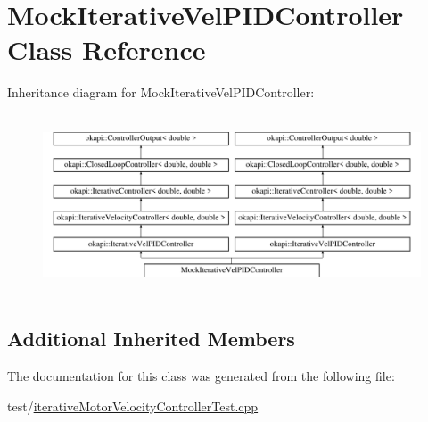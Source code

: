 \hypertarget{classMockIterativeVelPIDController}{}\section{Mock\+Iterative\+Vel\+P\+I\+D\+Controller Class Reference}
\label{classMockIterativeVelPIDController}
Inheritance diagram for Mock\+Iterative\+Vel\+P\+I\+D\+Controller\+:\begin{figure}[H]
\begin{center}
\leavevmode
\includegraphics[height=5.384615cm]{classMockIterativeVelPIDController}
\end{center}
\end{figure}
\subsection*{Additional Inherited Members}


The documentation for this class was generated from the following file\+:\begin{DoxyCompactItemize}
\item 
test/\mbox{\hyperlink{iterativeMotorVelocityControllerTest_8cpp}{iterative\+Motor\+Velocity\+Controller\+Test.\+cpp}}\end{DoxyCompactItemize}

